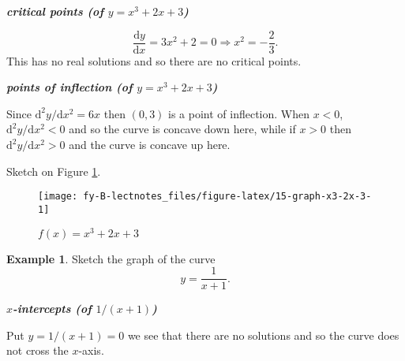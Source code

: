 \documentclass[
  11pt,
  oneside]{book}
\newcommand{\slide}{}
\theoremstyle{definition}
\theoremstyle{definition}
\newtheorem{example}{Example}[chapter]
\theoremstyle{definition}
\theoremstyle{definition}
\theoremstyle{remark}
\begin{document}
\begin{slidesonly}

\end{slidesonly}

\slide

\textbf{\emph{critical points (of \(y = x^3+2x+3\))}}

\begin{notslides}

\[
\frac{\mathrm{d} y}{\mathrm{d} x} = 3x^2+2 = 0 \Rightarrow x^2 = -\frac{2}{3}.
\]
This has no real solutions and so there are no critical points.

\end{notslides}

\slide

\textbf{\emph{points of inflection (of \(y = x^3+2x+3\))}}

\begin{notslides}

Since \(\mathrm{d}^2y/\mathrm{d} x^2 = 6x\) then \((0,3)\) is a point of
inflection.
When \(x < 0\), \(\mathrm{d}^2y/\mathrm{d} x^2<0\) and so the curve is
concave down here, while if \(x>0\) then \(\mathrm{d}^2y/\mathrm{d} x^2>0\) and the
curve is concave up here.

\end{notslides}

\begin{slidesonly}

\vfill

\end{slidesonly}

Sketch on Figure \ref{fig:15-graph-x3-2x-3}.

\begin{figure}

{\centering \texttt{[image: fy-B-lectnotes\_files/figure-latex/15-graph-x3-2x-3-1]} 

}

\caption{$f(x)=x^3+2x+3$}\label{fig:15-graph-x3-2x-3}
\end{figure}
\slide

\begin{example}
Sketch the graph of the curve
\[
y = \frac{1}{x+1}.
\]
\end{example}

\textbf{\emph{\(x\)-intercepts (of \(1/(x+1)\))}}

\begin{notslides}

Put \(y=1/(x+1) = 0\) we see that there are no solutions and so the curve does not cross the \(x\)-axis.

\end{notslides}
\end{document}
